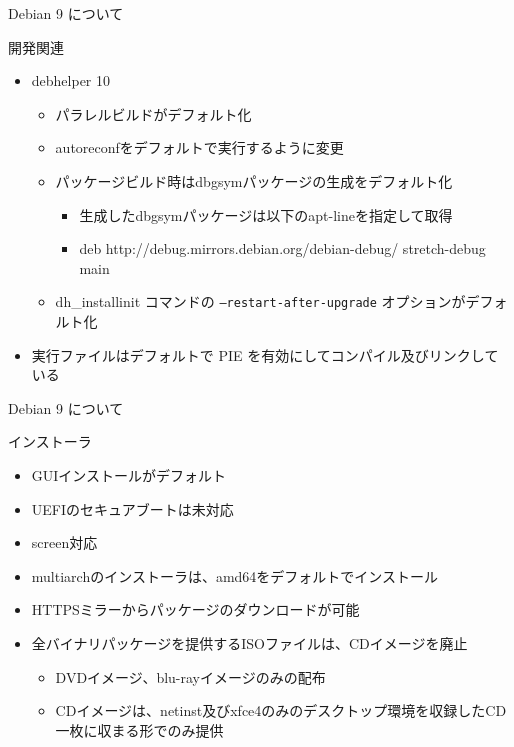 \begin{frame}{Debian 9 について}%

開発関連
\begin{itemize}
\item debhelper 10
  \begin{itemize}
  \item パラレルビルドがデフォルト化
  \item autoreconfをデフォルトで実行するように変更
  \item パッケージビルド時はdbgsymパッケージの生成をデフォルト化
    \begin{itemize}
    \item 生成したdbgsymパッケージは以下のapt-lineを指定して取得
    \item deb http://debug.mirrors.debian.org/debian-debug/ stretch-debug main
    \end{itemize}
  \item  dh\_installinit コマンドの \texttt{--restart-after-upgrade} オプションがデフォルト化
  \end{itemize}
\item 実行ファイルはデフォルトで PIE を有効にしてコンパイル及びリンクしている
\end{itemize}

\end{frame}


\begin{frame}{Debian 9 について}%

インストーラ
\begin{itemize}
\item GUIインストールがデフォルト
\item UEFIのセキュアブートは未対応
\item screen対応
\item multiarchのインストーラは、amd64をデフォルトでインストール
\item HTTPSミラーからパッケージのダウンロードが可能
\item 全バイナリパッケージを提供するISOファイルは、CDイメージを廃止
  \begin{itemize}
  \item DVDイメージ、blu-rayイメージのみの配布
  \item CDイメージは、netinst及びxfce4のみのデスクトップ環境を収録したCD一枚に収まる形でのみ提供
  \end{itemize}
\end{itemize}

\end{frame}


